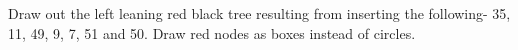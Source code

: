 \question

    
        

    
Draw out the left leaning red black tree resulting from inserting the following- 35, 11, 49, 9, 7, 51 and 50. Draw red nodes as boxes instead of circles.

